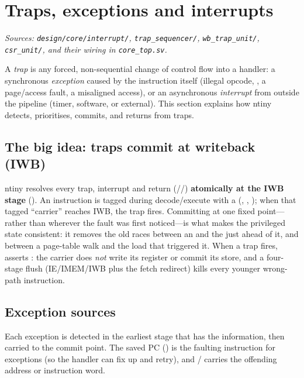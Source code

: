 \section{Traps, exceptions and interrupts}
\textit{Sources: \texttt{design/core/interrupt/}, \texttt{trap\_sequencer/},
\texttt{wb\_trap\_unit/}, \texttt{csr\_unit/}, and their wiring in
\texttt{core\_top.sv}.}

A \emph{trap} is any forced, non-sequential change of control flow into a
handler: a synchronous \emph{exception} caused by the instruction itself
(illegal opcode, , a page/access fault, a misaligned access), or an
asynchronous \emph{interrupt} from outside the pipeline (timer, software, or
external). This section explains how ntiny detects, prioritises, commits, and
returns from traps.


\subsection{The big idea: traps commit at writeback (IWB)}
ntiny resolves every trap, interrupt and return (//)
\textbf{atomically at the IWB stage} (). An instruction is
tagged during decode/execute with a  (,
, ); when that tagged ``carrier'' reaches IWB, the
trap fires. Committing at one fixed point---rather than wherever the fault was
first noticed---is what makes the privileged state consistent: it removes the
old races between an  and the  just ahead of it, and
between a page-table walk and the load that triggered it. When a trap fires,
 asserts : the carrier does \emph{not} write
its register or commit its store, and a four-stage flush (IE/IMEM/IWB plus the
fetch redirect) kills every younger wrong-path instruction.

\subsection{Exception sources}
Each exception is detected in the earliest stage that has the information, then
carried to the commit point. The saved PC () is the faulting
instruction for exceptions (so the handler can fix up and retry), and
/ carries the offending address or instruction word.

